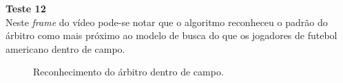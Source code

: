 \textbf{Teste 12}\\
Neste \textit{frame} do vídeo pode-se notar que o algoritmo reconheceu o padrão do árbitro como mais próximo ao modelo de busca do que os jogadores de futebol americano dentro de campo.
\begin{figure}
    \centering
    \caption{Reconhecimento do árbitro dentro de campo.}
\end{figure}